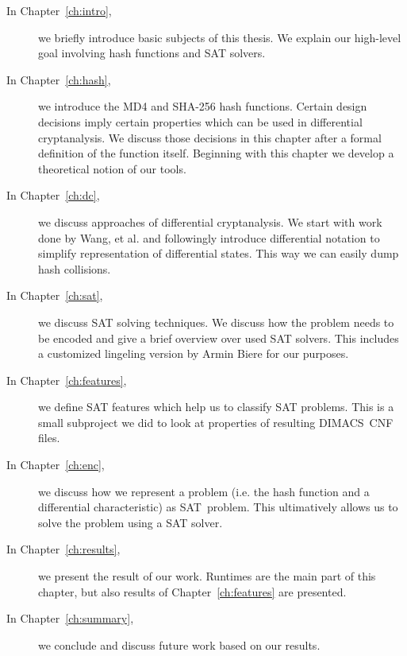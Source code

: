 \begin{description}
\item[In Chapter~\ref{ch:intro},] we briefly introduce basic subjects of this
  thesis. We explain our high-level goal involving hash functions and SAT solvers.

\item[In Chapter~\ref{ch:hash},] we introduce the MD4 and SHA-256 hash functions.
  Certain design decisions imply certain properties which can be used in differential
  cryptanalysis. We discuss those decisions in this chapter after a formal definition
  of the function itself. Beginning with this chapter we develop a theoretical notion
  of our tools.

\item[In Chapter~\ref{ch:dc},] we discuss approaches of differential cryptanalysis.
  We start with work done by Wang, et al. and followingly introduce differential
  notation to simplify representation of differential states. This way we can easily dump
  hash collisions.

\item[In Chapter~\ref{ch:sat},] we discuss SAT solving techniques. We discuss how
  the problem needs to be encoded and give a brief overview over used SAT solvers.
  This includes a customized lingeling version by Armin Biere for our purposes.

\item[In Chapter~\ref{ch:features},] we define SAT features which help us to
  classify SAT problems. This is a small subproject we did to look at properties
  of resulting DIMACS~CNF files.

\item[In Chapter~\ref{ch:enc},] we discuss how we represent a problem (i.e. the hash
  function and a differential characteristic) as SAT~problem. This ultimatively
  allows us to solve the problem using a SAT solver.

\item[In Chapter~\ref{ch:results},] we present the result of our work.
  Runtimes are the main part of this chapter, but also results of Chapter~\ref{ch:features}
  are presented.

\item[In Chapter~\ref{ch:summary},] we conclude and discuss future work based on our results.
\end{description}
